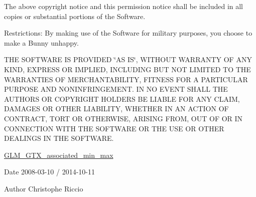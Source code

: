 The above copyright notice and this permission notice shall be included in all copies or substantial portions of the Software.

Restrictions\+: By making use of the Software for military purposes, you choose to make a Bunny unhappy.

T\+H\+E S\+O\+F\+T\+W\+A\+R\+E I\+S P\+R\+O\+V\+I\+D\+E\+D \char`\"{}\+A\+S I\+S\char`\"{}, W\+I\+T\+H\+O\+U\+T W\+A\+R\+R\+A\+N\+T\+Y O\+F A\+N\+Y K\+I\+N\+D, E\+X\+P\+R\+E\+S\+S O\+R I\+M\+P\+L\+I\+E\+D, I\+N\+C\+L\+U\+D\+I\+N\+G B\+U\+T N\+O\+T L\+I\+M\+I\+T\+E\+D T\+O T\+H\+E W\+A\+R\+R\+A\+N\+T\+I\+E\+S O\+F M\+E\+R\+C\+H\+A\+N\+T\+A\+B\+I\+L\+I\+T\+Y, F\+I\+T\+N\+E\+S\+S F\+O\+R A P\+A\+R\+T\+I\+C\+U\+L\+A\+R P\+U\+R\+P\+O\+S\+E A\+N\+D N\+O\+N\+I\+N\+F\+R\+I\+N\+G\+E\+M\+E\+N\+T. I\+N N\+O E\+V\+E\+N\+T S\+H\+A\+L\+L T\+H\+E A\+U\+T\+H\+O\+R\+S O\+R C\+O\+P\+Y\+R\+I\+G\+H\+T H\+O\+L\+D\+E\+R\+S B\+E L\+I\+A\+B\+L\+E F\+O\+R A\+N\+Y C\+L\+A\+I\+M, D\+A\+M\+A\+G\+E\+S O\+R O\+T\+H\+E\+R L\+I\+A\+B\+I\+L\+I\+T\+Y, W\+H\+E\+T\+H\+E\+R I\+N A\+N A\+C\+T\+I\+O\+N O\+F C\+O\+N\+T\+R\+A\+C\+T, T\+O\+R\+T O\+R O\+T\+H\+E\+R\+W\+I\+S\+E, A\+R\+I\+S\+I\+N\+G F\+R\+O\+M, O\+U\+T O\+F O\+R I\+N C\+O\+N\+N\+E\+C\+T\+I\+O\+N W\+I\+T\+H T\+H\+E S\+O\+F\+T\+W\+A\+R\+E O\+R T\+H\+E U\+S\+E O\+R O\+T\+H\+E\+R D\+E\+A\+L\+I\+N\+G\+S I\+N T\+H\+E S\+O\+F\+T\+W\+A\+R\+E.

\hyperlink{group__gtx__associated__min__max}{G\+L\+M\+\_\+\+G\+T\+X\+\_\+associated\+\_\+min\+\_\+max}

\begin{DoxyDate}{Date}
2008-\/03-\/10 / 2014-\/10-\/11 
\end{DoxyDate}
\begin{DoxyAuthor}{Author}
Christophe Riccio 
\end{DoxyAuthor}
